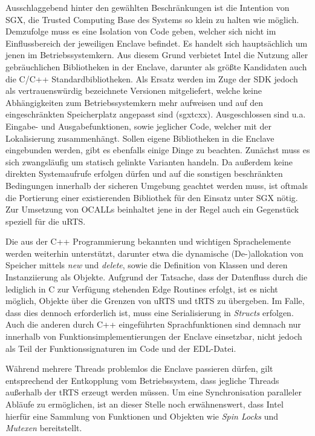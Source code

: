 Ausschlaggebend hinter den gewählten Beschränkungen ist die Intention von SGX, die Trusted Computing Base des Systems so klein zu halten wie möglich. Demzufolge muss es eine Isolation von Code geben, welcher sich nicht im Einflussbereich der jeweiligen Enclave befindet. Es handelt sich hauptsächlich um jenen im Betriebssystemkern. Aus diesem Grund verbietet Intel die Nutzung aller gebräuchlichen Bibliotheken in der Enclave, darunter als größte Kandidaten auch die C/C++ Standardbibliotheken. Als Ersatz werden im Zuge der SDK jedoch als vertrauenswürdig bezeichnete Versionen mitgeliefert, welche keine Abhängigkeiten zum Betriebssystemkern mehr aufweisen und auf den eingeschränkten Speicherplatz angepasst sind (sgx\textunderscore tcxx). Ausgeschlossen sind u.a. Eingabe- und Ausgabefunktionen, sowie jeglicher Code, welcher mit der Lokalisierung zusammenhängt. Sollen eigene Bibliotheken in die Enclave eingebunden werden, gibt es ebenfalls einige Dinge zu beachten. Zunächst muss es sich zwangsläufig um statisch gelinkte Varianten handeln. Da außerdem keine direkten Systemaufrufe erfolgen dürfen und auf die sonstigen beschränkten Bedingungen innerhalb der sicheren Umgebung geachtet werden muss, ist oftmals die Portierung einer existierenden Bibliothek für den Einsatz unter SGX nötig. Zur Umsetzung von OCALLs beinhaltet jene in der Regel auch ein Gegenstück speziell für die uRTS.
 
Die aus der C++ Programmierung bekannten und wichtigen Sprachelemente werden weiterhin unterstützt, darunter etwa die dynamische (De-)allokation von Speicher mittels \textit{new} und \textit{delete}, sowie die Definition von Klassen und deren Instanziierung als Objekte. Aufgrund der Tatsache, dass der Datenfluss durch die lediglich in C zur Verfügung stehenden Edge Routines erfolgt, ist es nicht möglich, Objekte über die Grenzen von uRTS und tRTS zu übergeben. Im Falle, dass dies dennoch erforderlich ist, muss eine Serialisierung in \textit{Structs} erfolgen. Auch die anderen durch C++ eingeführten Sprachfunktionen sind demnach nur innerhalb von Funktionsimplementierungen der Enclave einsetzbar, nicht jedoch als Teil der Funktionssignaturen im Code und der EDL-Datei.

Während mehrere Threads problemlos die Enclave passieren dürfen, gilt entsprechend der Entkopplung vom Betriebssystem, dass jegliche Threads außerhalb der tRTS erzeugt werden müssen. Um eine Synchronisation paralleler Abläufe zu ermöglichen, ist an dieser Stelle noch erwähnenswert, dass Intel hierfür eine Sammlung von Funktionen und Objekten wie \textit{Spin Locks} und \textit{Mutexen} bereitstellt.

